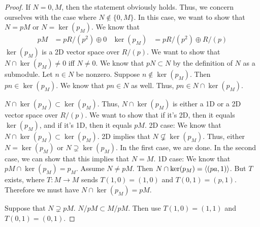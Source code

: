 \documentclass[../psets.tex]{subfiles}
\begin{document}
\begin{enumerate}
\begin{proof}
        If $N=0,M$, then the statement obviously holds. Thus, we concern ourselves with the case where $N\notin\{0,M\}$. In this case, we want to show that $N=pM$ or $N=\ker(p_M)$. We know that
        \begin{align*}
            pM &= pR/(p^2)\oplus 0&
            \ker(p_M) &= pR/(p^2)\oplus R/(p)
        \end{align*}
        $\ker(p_M)$ is a 2D vector space over $R/(p)$. We want to show that $N\cap\ker(p_M)\neq 0$ iff $N\neq 0$. We know that $pN\subset N$ by the definition of $N$ as a submodule. Let $n\in N$ be nonzero. Suppose $n\notin\ker(p_M)$. Then $pn\in\ker(p_M)$. We know that $pn\in N$ as well. Thus, $pn\in N\cap\ker(p_M)$.\par
        $N\cap\ker(p_M)\subset\ker(p_M)$. Thus, $N\cap\ker(p_M)$ is either a 1D or a 2D vector space over $R/(p)$. We want to show that if it's 2D, then it equals $\ker(p_M)$, and if it's 1D, then it equals $pM$. 2D case: We know that $N\cap\ker(p_M)\subset\ker(p_M)$. 2D implies that $N\not\subsetneq\ker(p_M)$. Thus, either $N=\ker(p_M)$ or $N\supsetneq\ker(p_M)$. In the first case, we are done. In the second case, we can show that this implies that $N=M$. 1D case: We know that $pM\cap\ker(p_M)=p_M$. Assume $N\neq pM$. Then $N\cap\ker(p_M)=\left\langle{(pa,1)}\right\rangle$. But $T$ exists, where $T:M\to M$ sends $T(1,0)=(1,0)$ and $T(0,1)=(p,1)$. Therefore we must have $N\cap\ker(p_M)=pM$.\par
        Suppose that $N\supsetneq pM$. $N/pM\subset M/pM$. Then use $T(1,0)=(1,1)$ and $T(0,1)=(0,1)$.
    \end{proof}
\end{enumerate}
\end{document}
